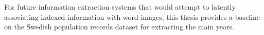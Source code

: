 For future information extraction systems that would attempt to latently associating indexed information with word images, this thesis provides a baseline on the Swedish population records dataset for extracting the main years.






